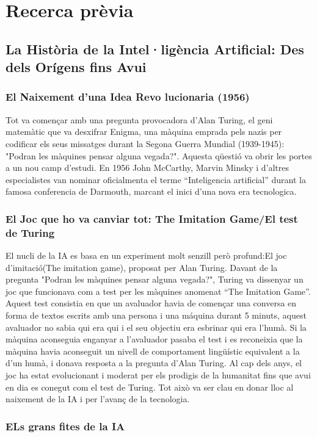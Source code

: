  \chapter{Recerca prèvia}
\label{c:intro}
\section{La Història de la Intel·ligència Artificial: Des dels Orígens fins Avui}
\subsection{El Naixement d'una Idea Revo lucionaria (1956)}
Tot va començar amb una pregunta provocadora d’Alan Turing, el geni matemàtic que va desxifrar Enigma, una màquina emprada pels nazis per codificar els seus missatges durant la Segona Guerra Mundial (1939-1945): "Podran les màquines pensar alguna vegada?". Aquesta qüestió va obrir les portes a un nou camp d’estudi. En 1956 John McCarthy, Marvin Minsky i d'altres especialistes van nominar oficialmenta el terme ``Inteligencia artificial'' durant la famosa conferencia de Darmouth, marcant el inici d'una nova era tecnologica.
\subsection{El Joc que ho va canviar tot: The Imitation Game/El test de Turing}
El nucli de la IA es basa en un experiment molt senzill però profund:El joc d'imitació(The imitation game), proposat per Alan Turing. Davant de la pregunta "Podran les màquines pensar alguna vegada?", Turing va dissenyar un joc que funcionava com a test per les màquines anomenat ``The Imitation Game''. Aquest test consistia en que un avaluador havia de començar una conversa en forma de textos escrits amb una persona i una máquina durant 5 minuts, aquest avaluador no sabia qui era qui i el seu objectiu era esbrinar qui era l'humà. Si la màquina aconseguia enganyar a l'avaluador pasaba el test i es reconeixia que la màquina havia aconseguit un nivell de comportament lingüístic equivalent a la d'un humà, i donava resposta a la pregunta d'Alan Turing. Al cap dels anys, el joc ha estat evolucionant i moderat per els prodigis de la humanitat fins que avui en dia es conegut com el test de Turing. Tot això va ser clau en  donar lloc al naixement de la IA i per l'avanç de la tecnologia.
\subsection{ELs grans fites de la IA}
